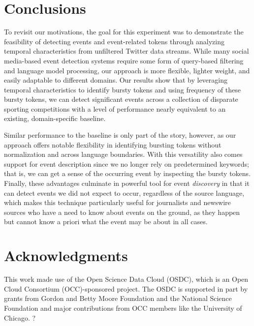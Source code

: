 \documentclass{acm_proc_article-sp}
\begin{document}
\section{Conclusions}
\label{sect:conlusions}

To revisit our motivations, the goal for this experiment was to demonstrate the feasibility of detecting events and event-related tokens through analyzing temporal characteristics from unfiltered Twitter data streams.
While many social media-based event detection systems require some form of query-based filtering and language model processing, our approach is more flexible, lighter weight, and easily adaptable to different domains.
Our results show that by leveraging temporal characteristics to identify bursty tokens and using frequency of these bursty tokens, we can detect significant events across a collection of disparate sporting competitions with a level of performance nearly equivalent to an existing, domain-specific baseline.

Similar performance to the baseline is only part of the story, however, as our approach offers notable flexibility in identifying bursting tokens without normalization and across language boundaries.
With this versatility also comes support for event description since we no longer rely on predetermined keywords; that is, we can get a sense of the occurring event by inspecting the bursty tokens.
Finally, these advantages culminate in powerful tool for event \emph{discovery} in that it can detect events we did not expect to occur, regardless of the source language, which makes this technique particularly useful for journalists and newswire sources who have a need to know about events on the ground, as they happen but cannot know a priori what the event may be about in all cases.


\section{Acknowledgments}
This work made use of the Open Science Data Cloud (OSDC), which is an Open Cloud Consortium (OCC)-sponsored project. 
The OSDC is supported in part by grants from Gordon and Betty Moore Foundation and the National Science Foundation and major contributions from OCC members like the University of Chicago. 
?

%

%
%
\end{document}
